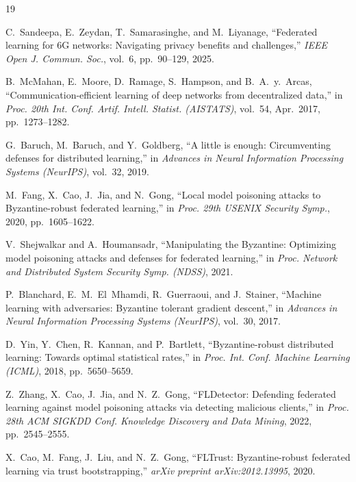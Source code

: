 \documentclass[journal]{IEEEtran}
\begin{document}
\begin{thebibliography}{19}

C.~Sandeepa, E.~Zeydan, T.~Samarasinghe, and M.~Liyanage, ``Federated learning for 6G networks: Navigating privacy benefits and challenges,'' \textit{IEEE Open J. Commun. Soc.}, vol.~6, pp.~90--129, 2025.

B.~McMahan, E.~Moore, D.~Ramage, S.~Hampson, and B.~A.~y.~Arcas, ``Communication-efficient learning of deep networks from decentralized data,'' in \textit{Proc. 20th Int. Conf. Artif. Intell. Statist. (AISTATS)}, vol.~54, Apr.~2017, pp.~1273--1282.

G.~Baruch, M.~Baruch, and Y.~Goldberg, ``A little is enough: Circumventing defenses for distributed learning,'' in \textit{Advances in Neural Information Processing Systems (NeurIPS)}, vol.~32, 2019.

M.~Fang, X.~Cao, J.~Jia, and N.~Gong, ``Local model poisoning attacks to Byzantine-robust federated learning,'' in \textit{Proc. 29th USENIX Security Symp.}, 2020, pp.~1605--1622.

V.~Shejwalkar and A.~Houmansadr, ``Manipulating the Byzantine: Optimizing model poisoning attacks and defenses for federated learning,'' in \textit{Proc. Network and Distributed System Security Symp. (NDSS)}, 2021.

P.~Blanchard, E.~M.~El~Mhamdi, R.~Guerraoui, and J.~Stainer, ``Machine learning with adversaries: Byzantine tolerant gradient descent,'' in \textit{Advances in Neural Information Processing Systems (NeurIPS)}, vol.~30, 2017.

D.~Yin, Y.~Chen, R.~Kannan, and P.~Bartlett, ``Byzantine-robust distributed learning: Towards optimal statistical rates,'' in \textit{Proc. Int. Conf. Machine Learning (ICML)}, 2018, pp.~5650--5659.

Z.~Zhang, X.~Cao, J.~Jia, and N.~Z.~Gong, ``FLDetector: Defending federated learning against model poisoning attacks via detecting malicious clients,'' in \textit{Proc. 28th ACM SIGKDD Conf. Knowledge Discovery and Data Mining}, 2022, pp.~2545--2555.

X.~Cao, M.~Fang, J.~Liu, and N.~Z.~Gong, ``FLTrust: Byzantine-robust federated learning via trust bootstrapping,'' \textit{arXiv preprint arXiv:2012.13995}, 2020.


\end{thebibliography}
\end{document}
